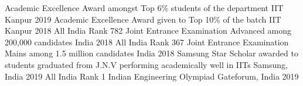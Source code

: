 
\begin{cvhonors}
	\cvhonor
	{Academic Excellence Award}
	{amongst Top 6\% students of the department}
	{IIT Kanpur}
	{2019}
  \cvhonor
    {Academic Excellence Award}
    {given to Top 10\% of the batch}
    {IIT Kanpur}
    {2018}
  \cvhonor
    {All India Rank 782}
    {Joint Entrance Examination Advanced among 200,000 candidates}
    {India}
    {2018}
  \cvhonor
     {All India Rank 367}
    {Joint Entrance Examination Mains among 1.5 million candidates}
    {India}
    {2018}
  \cvhonor
     {Samsung Star Scholar}
    {awarded to students graduated from J.N.V performing academically well in IITs}
    {Samsung, India}
    {2019}
  \cvhonor
   {All India Rank 1}
    {Indian Engineering Olympiad}
    {Gateforum, India}
    {2019}
    
\end{cvhonors}


